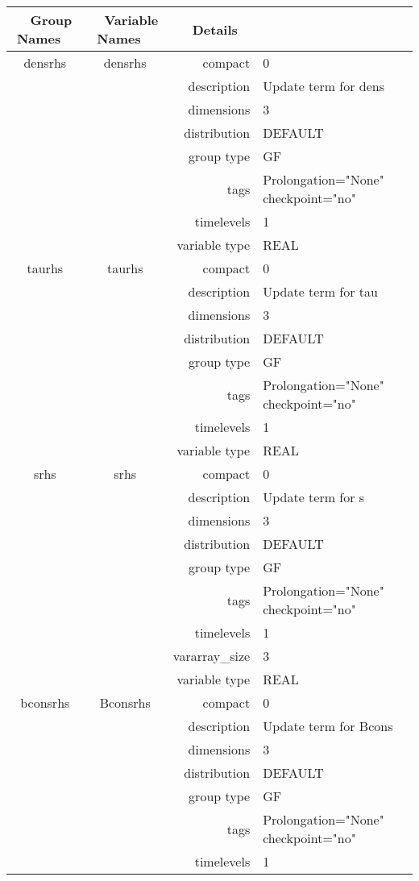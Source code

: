 \documentclass{article}
\begin{document}
\begin{tabular*}{150mm}{|c|c@{\extracolsep{\fill}}|rl|} \hline 
~ {\bf Group Names} ~ & ~ {\bf Variable Names} ~  &{\bf Details} ~ & ~ \\ 
\hline 
densrhs & densrhs & compact & 0 \\ 
 &  & description & Update term for dens \\ 
 &  & dimensions & 3 \\ 
 &  & distribution & DEFAULT \\ 
 &  & group type & GF \\ 
 &  & tags & Prolongation="None" checkpoint="no" \\ 
 &  & timelevels & 1 \\ 
 &  & variable type & REAL \\ 
\hline 
taurhs & taurhs & compact & 0 \\ 
 &  & description & Update term for tau \\ 
 &  & dimensions & 3 \\ 
 &  & distribution & DEFAULT \\ 
 &  & group type & GF \\ 
 &  & tags & Prolongation="None" checkpoint="no" \\ 
 &  & timelevels & 1 \\ 
 &  & variable type & REAL \\ 
\hline 
srhs & srhs & compact & 0 \\ 
 &  & description & Update term for s \\ 
 &  & dimensions & 3 \\ 
 &  & distribution & DEFAULT \\ 
 &  & group type & GF \\ 
 &  & tags & Prolongation="None" checkpoint="no" \\ 
 &  & timelevels & 1 \\ 
 &  & vararray\_size & 3 \\ 
 &  & variable type & REAL \\ 
\hline 
bconsrhs & Bconsrhs & compact & 0 \\ 
 &  & description & Update term for Bcons \\ 
 &  & dimensions & 3 \\ 
 &  & distribution & DEFAULT \\ 
 &  & group type & GF \\ 
 &  & tags & Prolongation="None" checkpoint="no" \\ 
 &  & timelevels & 1 \\ 

\end{tabular*}
\end{document}
